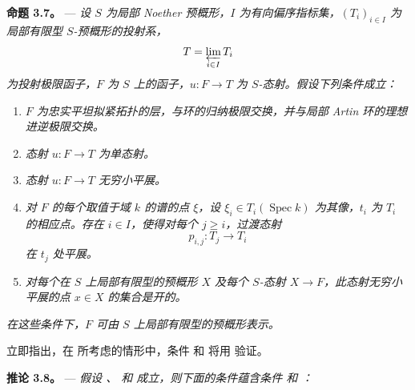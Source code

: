 
\medskip\noindent{}\textbf{命题 3.7。} --- \textit{设 \(S\) 为局部 Noether 预概形，\(I\) 为有向偏序指标集，\((T_i)_{i\in I}\) 为局部有限型 \(S\)-预概形的投射系，\[
  T=\varprojlim_{i\in I}T_i
\] 为投射极限函子，\(F\) 为 \(S\) 上的函子，\(u:F\to T\) 为 \(S\)-态射。假设下列条件成立：}

\begin{enumerate}\item[(a)]\textit{\(F\) 为忠实平坦拟紧拓扑的层，与环的归纳极限交换，并与局部 Artin 环的理想进逆极限交换。}

\item[(b)]\textit{态射 \(u:F\to T\) 为单态射。}

\item[\(b'\)]\textit{态射 \(u:F\to T\) 无穷小平展。}

\item[(c)]\textit{对 \(F\) 的每个取值于域 \(k\) 的谱的点 \(\xi\)，设 \(\xi_i\in T_i(\operatorname{Spec}k)\) 为其像，\(t_i\) 为 \(T_i\) 的相应点。存在 \(i\in I\)，使得对每个 \(j\geq i\)，过渡态射 \[
  p_{i,j}:T_j\longrightarrow T_i
\] 在 \(t_j\) 处平展。}

\item[(d)]\textit{对每个在 \(S\) 上局部有限型的预概形 \(X\) 及每个 \(S\)-态射 \(X\to F\)，此态射无穷小平展的点 \(x\in X\) 的集合是开的。}\end{enumerate}

\textit{在这些条件下，\(F\) 可由 \(S\) 上局部有限型的预概形表示。}

立即指出，在  所考虑的情形中，条件  和  将用  验证。

\medskip\noindent{}\textbf{推论 3.8。} --- \textit{假设 、 和  成立，则下面的条件蕴含条件  和 ：}

